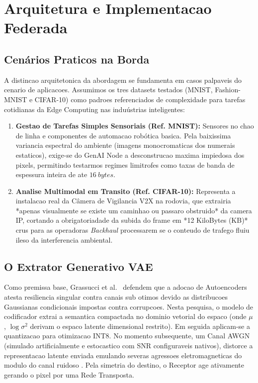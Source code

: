 \documentclass[conference]{IEEEtran}
\begin{document}
\section{Arquitetura e Implementacao Federada}

\subsection{Cenários Praticos na Borda}

A distincao arquitetonica da abordagem se fundamenta em casos palpaveis do cenario de aplicacoes. Assumimos os tres datasets testados (MNIST, Fashion-MNIST e CIFAR-10) como padroes referenciados de complexidade para tarefas cotidianas da Edge Computing nas induústrias inteligentes:
\begin{enumerate}
    \item \textbf{Gestao de Tarefas Simples Sensoriais (Ref. MNIST):} Sensores no chao de linha e componentes de automacao robótica basica. Pela baixissima variancia espectral do ambiente (imagens monocromaticas dos numerais estaticos), exige-se do GenAI Node a desconstrucao maxima impiedosa dos pixels, permitindo testarmos regimes limitrofes como taxas de banda de espessura inteira de ate $16~bytes$. 
    \item \textbf{Analise Multimodal em Transito (Ref. CIFAR-10):} Representa a instalacao real da Câmera de Vigilancia V2X na rodovia, que extrairia *apenas visualmente se existe um caminhao ou passaro obstruido* da camera IP, cortando a obrigatoriadade da subida do frame em *12 KiloBytes (KB)* crus para as operadoras \textit{Backhaul} processarem se o conteudo de trafego fluiu ileso da interferencia ambiental.
\end{enumerate}

\subsection{O Extrator Generativo VAE}

Como premissa base, Grassucci et al.~\cite{grassucci2023genai_meets_semcom} defendem que a adocao de Autoencoders atesta resiliencia singular contra canais sub otimos devido as distribucoes Gaussianas condicionais impostas contra corrupcoes. 
Nesta pesquisa, o modelo de codificador extrai a semantica compactada no dominio vetorial do espaco (onde $\mu$, $\log\sigma^2$ derivam o espaco latente dimensional restrito). Em seguida aplicam-se a quantizacao para otimizacao INT8. No momento subsequente, um Canal AWGN (simulado artificialmente e estocastico com SNR configuraveis nativos), distorce a representacao latente enviada emulando severas agressoes eletromagneticas do modulo do canal ruidoso \cite{xia2023gennet_layer}. 
Pela simetria do destino, o Receptor age ativamente gerando o pixel por uma Rede Transposta.
\end{document}
